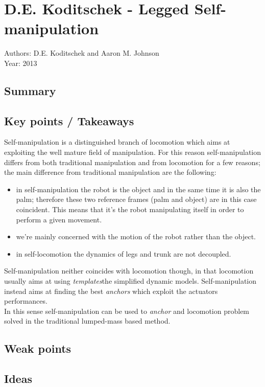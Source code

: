 \section{D.E. Koditschek - Legged Self-manipulation \cite{johnson}}
Authors: D.E. Koditschek and Aaron M. Johnson\\
Year: 2013
\subsection*{Summary}
\subsection*{Key points / Takeaways}
Self-manipulation is a distinguished branch of locomotion which aims at exploiting the well mature field of manipulation. For this reason self-manipulation differs from both traditional manipulation and from locomotion for a few reasons; the main difference from traditional manipulation are the following:
\begin{itemize}
\item in self-manipulation the robot is the object and in the same time it is also the palm; therefore these two reference frames (palm and object) are in this case coincident. This means that it's the robot manipulating itself in order to perform a given movement.
\item we're mainly concerned with the motion of the robot rather than the object.
\item in self-locomotion the dynamics of legs and trunk are not decoupled.
\end{itemize}
Self-manipulation neither coincides with locomotion though, in that locomotion usually aims at using \textit{templates}the simplified dynamic models. Self-manipulation instead aims at finding the best \textit{anchors} which exploit the actuators performances.\\
In this sense self-manipulation can be used to \textit{anchor} and locomotion problem solved in the traditional lumped-mass based method.
\subsection*{Weak points}
\subsection*{Ideas}
